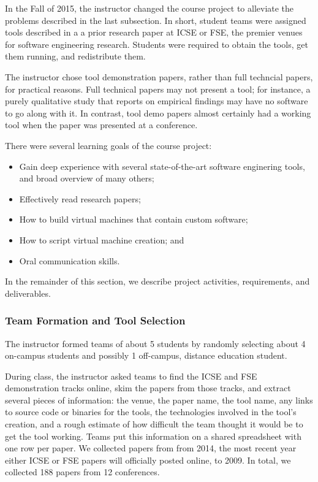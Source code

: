 \documentclass[10pt,conference]{IEEEtran}
\begin{document}
In the Fall of 2015, the instructor changed the course project
to alleviate the problems described in the last subsection.
In short, student teams were assigned tools described in a 
a prior research paper at ICSE or FSE, the premier 
venues for software engineering research.
Students were required to obtain the tools, get them running,
and redistribute them.

The instructor chose tool demonstration papers, rather than
full techncial papers, for practical reasons.
Full technical papers may not present a tool; for 
instance, a purely qualitative study that reports on 
empirical findings may have no software to go along with it.
In contrast, tool demo papers almost certainly had a working
tool when the paper was presented at a conference. 

There were several learning goals of the course project:

\begin{itemize}
  \item Gain deep experience with several state-of-the-art
  		software enginering tools, and broad overview of many others;
  \item Effectively read research papers;
  \item How to build virtual machines that contain custom
  		software;
  \item How to script virtual machine creation; and
  \item Oral communication skills. 
\end{itemize}

In the remainder of this section, we describe project
activities, requirements, and deliverables.

\subsubsection{Team Formation and Tool Selection}

The instructor formed teams of about 5 students by randomly
selecting about 4 on-campus students and possibly 1 off-campus, distance
education student.

During class, the instructor asked teams to find the ICSE
and FSE demonstration tracks online, skim the papers from those
tracks, and extract several pieces of information:
the venue, the paper name, the tool name, any links to source
code or binaries for the tools, the technologies involved in the 
tool's creation, and a rough estimate of how 
difficult the team thought it would be to get the tool working.
Teams put this information on a shared spreadsheet with one row per paper.
We collected papers from from 2014, the most recent year either ICSE or FSE
papers will officially posted online, to 2009.
In total, we collected 188 papers from 12 conferences.
\end{document}
